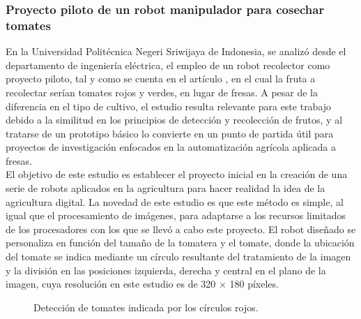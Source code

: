 \subsubsection{Proyecto piloto de un robot manipulador para cosechar tomates}
En la Universidad Politécnica Negeri Sriwijaya de Indonesia, se analizó desde el departamento de ingeniería eléctrica, el empleo de un robot recolector como proyecto piloto, tal y como se cuenta en el artículo \cite{Oktarina20}, en el cual la fruta a recolectar serían tomates rojos y verdes, en lugar de fresas. A pesar de la diferencia en el tipo de cultivo, el estudio resulta relevante para este trabajo debido a la similitud en los principios de detección y recolección de frutos, y al tratarse de un prototipo básico lo convierte en un punto de partida útil para proyectos de investigación enfocados en la automatización agrícola aplicada a fresas.\\

El objetivo de este estudio es establecer el proyecto inicial en la creación de una serie de robots aplicados en la agricultura para hacer realidad la idea de la agricultura digital. La novedad de este estudio es que este método es simple, al igual que el procesamiento de imágenes, para adaptarse a los recursos limitados de los procesadores con los que se llevó a cabo este proyecto. El robot diseñado se personaliza en función del tamaño de la tomatera y el tomate, donde la ubicación del tomate se indica mediante un círculo resultante del tratamiento de la imagen y la división en las posiciones izquierda, derecha y central en el plano de la imagen, cuya resolución en este estudio es de 320 × 180 píxeles. 

\begin{figure}[h!]
    \begin{center}
      \subcapcentertrue
      \hspace{2mm}
    \end{center}
    \caption{Detección de tomates indicada por los círculos rojos.}
    \label{fig:Deteccion_tomates}
  \end{figure}

